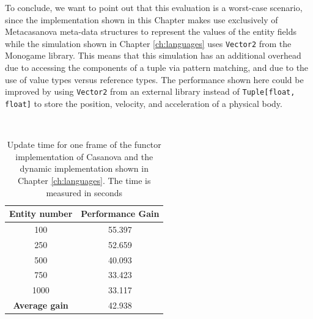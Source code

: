 To conclude, we want to point out that this evaluation is a worst-case scenario, since the implementation shown in this Chapter makes use exclusively of Metacasanova meta-data structures to represent the values of the entity fields while the simulation shown in Chapter \ref{ch:languages} uses \texttt{Vector2} from the Monogame library. This means that this simulation has an additional overhead due to accessing the components of a tuple via pattern matching, and due to the use of value types versus reference types. The performance shown here could be improved by using \texttt{Vector2} from an external library instead of \texttt{Tuple[float, float]} to store the position, velocity, and acceleration of a physical body.
\begin{table}
  \\
  
  \vspace{0.5cm}
  \begin{tabular}{|c|c|}
  \hline
  \textbf{Entity number} & \textbf{Performance Gain}\\
  \hline
  100 &	55.397\\
  250 &	52.659\\
  500 &	40.093\\
  750 &	33.423\\
  1000 & 33.117\\
  \hline
  \textbf{Average gain} & 42.938 \\
  \hline
  \end{tabular}
 	\caption{Update time for one frame of the functor implementation of Casanova and the dynamic implementation shown in Chapter \ref{ch:languages}. The time is measured in seconds}
  \label{tab:ch_networking_evaluation}
\end{table}

